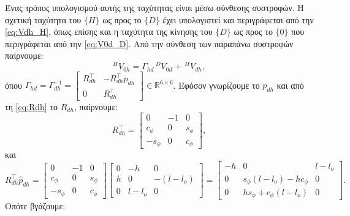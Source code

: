 \documentclass[12pt]{article} %
\numberwithin{equation}{section}  %
\begin{document}
Ένας τρόπος υπολογισμού αυτής της ταχύτητας είναι μέσω σύνθεσης συστροφών. 
Η σχετική ταχύτητα του $\{H\}$ ως προς το $\{D\}$ έχει υπολογιστεί και περιγράφεται από την \eqref{eq:Vdh_H}, 
όπως επίσης και η ταχύτητα της κίνησης του $\{D\}$ ως προς το $\{0\}$ που περιγράφεται από την \eqref{eq:V0d_D}.
Από την σύνθεση των παραπάνω συστροφών παίρνουμε:
\begin{equation}\label{eq:V0h_H}
    ^{H}V_{0h} =
    \Gamma_{hd} \, ^{D}V_{0d} + \, ^{H}V_{dh}, 
\end{equation}
όπου $\Gamma_{hd} = \Gamma^{-1}_{dh} = \begin{bmatrix}
    R_{dh}^{\top}  &  - R_{dh}^{\top} \widehat{p}_{dh} \\
    0              &  R_{dh}^{\top}
\end{bmatrix} \in \mathbb{R}^{6 \times 6}$. Εφόσον γνωρίζουμε το ${p}_{dh}$ και από τη \eqref{eq:Rdh} το $R_{dh}$, παίρνουμε:
\begin{equation*}
     R_{dh}^{\top} = \begin{bmatrix}
        0          &  -1  &  0        \\
        c_{\phi}   &  0   &  s_{\phi}  \\
        -s_{\phi}  &  0   &  c_{\phi}
    \end{bmatrix},
\end{equation*}
και
\begin{equation*}
    R_{dh}^{\top} \widehat{p}_{dh} = \begin{bmatrix}
        0          &  -1  &  0        \\
        c_{\phi}   &  0   &  s_{\phi}  \\
        -s_{\phi}  &  0   &  c_{\phi}
    \end{bmatrix} \begin{bmatrix}
        0   &  -h      &  0        \\
        h   &  0       &  -(l-l_o) \\
        0   &  l-l_o   &  0
    \end{bmatrix} = \begin{bmatrix}
        -h   &  0                                &  l-l_o \\
        0    &  s_{\phi}(l-l_o) - h c_{\phi}    &  0 \\
        0    &  h s_{\phi} + c_{\phi}(l-l_o)    &  0
    \end{bmatrix}.
\end{equation*}
Οπότε βγάζουμε:
\end{document}
